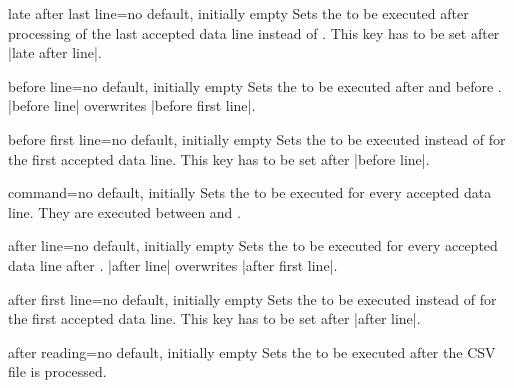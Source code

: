 \documentclass[a4paper,11pt]{ltxdoc}
\begin{document}
\begin{docCsvKey}{late after last line}{=}{no default, initially empty}
  Sets the  to be executed after processing of the last
  accepted data line instead of .
  This key has to be set after |late after line|.
\end{docCsvKey}


\begin{docCsvKey}{before line}{=}{no default, initially empty}
  Sets the  to be executed after 
  and before .
  |before line| overwrites |before first line|.
\end{docCsvKey}


\begin{docCsvKey}{before first line}{=}{no default, initially empty}
  Sets the  to be executed instead of 
  for the first accepted data line.
  This key has to be set after |before line|.
\end{docCsvKey}


\begin{docCsvKey}{command}{=}{no default, initially }
  Sets the  to be executed for every accepted data line.
  They are executed between  and .
\end{docCsvKey}


\begin{docCsvKey}{after line}{=}{no default, initially empty}
  Sets the  to be executed for every accepted data line
  after .
  |after line| overwrites |after first line|.
\end{docCsvKey}


\begin{docCsvKey}{after first line}{=}{no default, initially empty}
  Sets the  to be executed instead of 
  for the first accepted data line.
  This key has to be set after |after line|.
\end{docCsvKey}

\begin{docCsvKey}{after reading}{=}{no default, initially empty}
  Sets the  to be executed after the CSV file is processed.
\end{docCsvKey}
\end{document}
